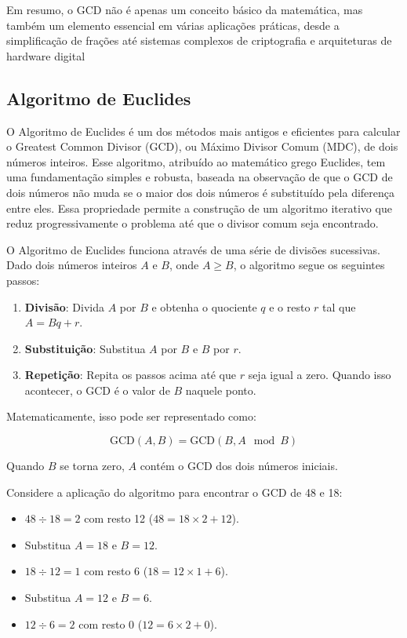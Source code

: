 \documentclass[a4paper,11pt]{article} %
\begin{document}
Em resumo, o GCD não é apenas um conceito básico da matemática, mas também um elemento essencial em várias aplicações práticas, desde a simplificação de frações até sistemas complexos de criptografia e arquiteturas de hardware digital

\subsection{Algoritmo de Euclides}
O Algoritmo de Euclides é um dos métodos mais antigos e eficientes para calcular o Greatest Common Divisor (GCD), ou Máximo Divisor Comum (MDC), de dois números inteiros. Esse algoritmo, atribuído ao matemático grego Euclides, tem uma fundamentação simples e robusta, baseada na observação de que o GCD de dois números não muda se o maior dos dois números é substituído pela diferença entre eles. Essa propriedade permite a construção de um algoritmo iterativo que reduz progressivamente o problema até que o divisor comum seja encontrado.

O Algoritmo de Euclides funciona através de uma série de divisões sucessivas. Dado dois números inteiros \( A \) e \( B \), onde \( A \geq B \), o algoritmo segue os seguintes passos:

\begin{enumerate}
    \item \textbf{Divisão}: Divida \( A \) por \( B \) e obtenha o quociente \( q \) e o resto \( r \) tal que \( A = Bq + r \).
    \item \textbf{Substituição}: Substitua \( A \) por \( B \) e \( B \) por \( r \).
    \item \textbf{Repetição}: Repita os passos acima até que \( r \) seja igual a zero. Quando isso acontecer, o GCD é o valor de \( B \) naquele ponto.
\end{enumerate}

Matematicamente, isso pode ser representado como:

\[
\text{GCD}(A, B) = \text{GCD}(B, A \mod B)
\]

Quando \( B \) se torna zero, \( A \) contém o GCD dos dois números iniciais.

Considere a aplicação do algoritmo para encontrar o GCD de 48 e 18:

\begin{itemize}
    \item \( 48 \div 18 = 2 \) com resto 12 (\( 48 = 18 \times 2 + 12 \)).
    \item Substitua \( A = 18 \) e \( B = 12 \).
    \item \( 18 \div 12 = 1 \) com resto 6 (\( 18 = 12 \times 1 + 6 \)).
    \item Substitua \( A = 12 \) e \( B = 6 \).
    \item \( 12 \div 6 = 2 \) com resto 0 (\( 12 = 6 \times 2 + 0 \)).
\end{itemize}
\end{document}
